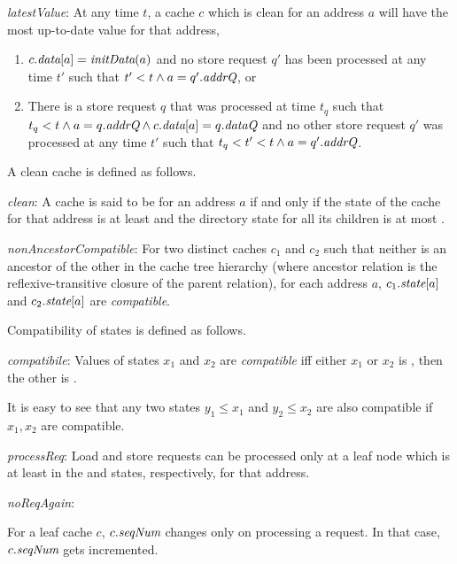 \begin{inv}
\textit{latestValue}:
At any time $t$, a cache $c$ which is clean for an address $a$ will have the most
up-to-date value for that address, \ie{}
\begin{enumerate}
\item $c.\textit{data}[a] = \textit{initData}(a)$ and no store request $q'$ has been processed at
any time $t'$ such that $t' < t \wedge a = q'.\textit{addrQ}$, or
\item There is a store request $q$ that was processed at time $t_q$ such that
$t_q < t \wedge a = q.\textit{addrQ} \wedge c.\textit{data}[a] = q.\textit{dataQ}$ and no other store
request $q'$ was processed at any time $t'$ such that $t_q < t' < t \wedge a =
q'.\textit{addrQ}$.
\end{enumerate}
\label{latestValue}
\end{inv}
A clean cache is defined as follows.
\begin{defn}
\textit{clean}: A cache is said to be \clean{} for an address $a$ if and only if
the state of the cache for that address is at least \Sh{} and the directory 
state for all its children is at most \Sh.
\label{clean}
\end{defn}

\begin{inv}
\textit{nonAncestorCompatible}: For two distinct caches $c_1$ and $c_2$ such
that neither is an ancestor of the other in the cache tree hierarchy (where
ancestor relation is the reflexive-transitive closure of the parent relation),
for each address $a$, $c_1.\textit{state}[a]$ and $c_2.\textit{state}[a]$ are
\textit{compatible}.
\label{nonAncestorCompatible}
\end{inv}
Compatibility of states is defined as follows.
\begin{defn}
\textit{compatibile}: Values of states $x_1$ and $x_2$ are \textit{compatible}
iff either $x_1$ or $x_2$ is \Mo{}, then the other is \In.
\label{compatible}
\end{defn}

It is easy to see that any two states $y_1 \le x_1$ and $y_2 \le x_2$ are also
compatible if $x_1, x_2$ are compatible.

\begin{inv}
\textit{processReq}: Load and store requests can be processed only at a leaf
node which is at least in the \Sh{} and \Mo{} states, respectively, for that
address.
\label{processReq}
\end{inv}

\begin{inv}
\textit{noReqAgain}:
\item For a leaf cache $c$, $c.\textit{seqNum}$ changes only on processing a request. In
that case, $c.\textit{seqNum}$ gets incremented.
\label{noReqAgain}
\end{inv}

